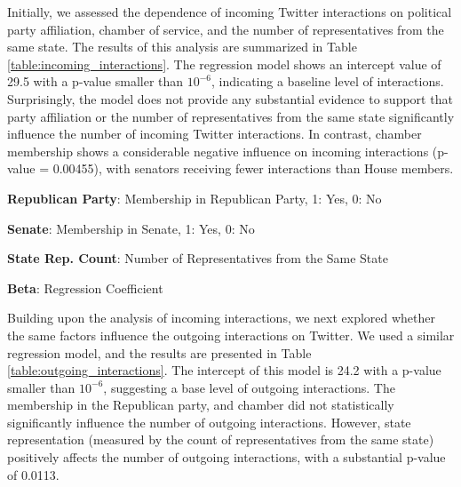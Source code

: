\documentclass[11pt]{article}
\begin{document}
Initially, we assessed the dependence of incoming Twitter interactions on political party affiliation, chamber of service, and the number of representatives from the same state. The results of this analysis are summarized in Table \ref{table:incoming_interactions}. The regression model shows an intercept value of 29.5 with a p-value smaller than $10^{-6}$, indicating a baseline level of interactions. Surprisingly, the model does not provide any substantial evidence to support that party affiliation or the number of representatives from the same state significantly influence the number of incoming Twitter interactions. In contrast, chamber membership shows a considerable negative influence on incoming interactions (p-value = 0.00455), with senators receiving fewer interactions than House members.

\begin{table}[h]
\caption{Regression results for variables predicting incoming interactions}
\label{table:incoming_interactions}
\begin{threeparttable}
\renewcommand{\TPTminimum}{\linewidth}
\begin{tablenotes}
\footnotesize
\item \textbf{Republican Party}: Membership in Republican Party, 1: Yes, 0: No
\item \textbf{Senate}: Membership in Senate, 1: Yes, 0: No
\item \textbf{State Rep. Count}: Number of Representatives from the Same State
\item \textbf{Beta}: Regression Coefficient
\end{tablenotes}
\end{threeparttable}
\end{table}


Building upon the analysis of incoming interactions, we next explored whether the same factors influence the outgoing interactions on Twitter. We used a similar regression model, and the results are presented in Table \ref{table:outgoing_interactions}. The intercept of this model is 24.2 with a p-value smaller than $10^{-6}$, suggesting a base level of outgoing interactions. The membership in the Republican party, and chamber did not statistically significantly influence the number of outgoing interactions. However, state representation (measured by the count of representatives from the same state) positively affects the number of outgoing interactions, with a substantial p-value of 0.0113.
\end{document}
